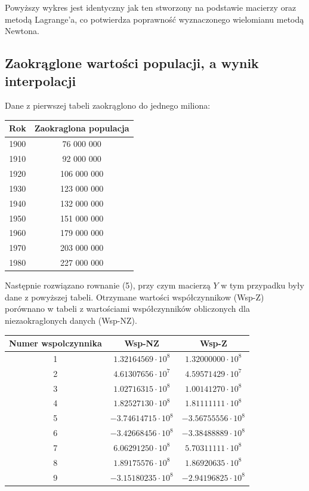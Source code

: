 \documentclass{article}
\begin{document}
	Powyższy wykres jest identyczny jak ten stworzony na podstawie macierzy oraz metodą Lagrange'a, co potwierdza poprawność wyznaczonego wielomianu metodą Newtona.
	
	
	
	\subsection*{Zaokrąglone wartości populacji, a wynik interpolacji}
	
	Dane z pierwszej tabeli zaokrąglono do jednego miliona:
	
	\begin{center}
		\begin{tabular}{c|c}
  			\hline 
  			Rok & Zaokraglona populacja\\
  			\hline
  			1900 & 76 000 000 \\
  			1910 & 92 000 000 \\
  			1920 & 106 000 000 \\
  			1930 & 123 000 000 \\
  			1940 & 132 000 000 \\
  			1950 & 151 000 000 \\
  			1960 & 179 000 000 \\
  			1970 & 203 000 000 \\
  			1980 & 227 000 000 \\
		\end{tabular} 
		
	\end{center}
	
	Następnie rozwiązano rownanie (5), przy czym macierzą $Y$ w tym przypadku były dane z powyższej tabeli. Otrzymane wartości współczynnikow (Wsp-Z) porównano w tabeli z wartościami współczynników obliczonych dla niezaokraglonych danych (Wsp-NZ).
	
	
	\begin{center}
		\begin{tabular}{|c|c|c|}
  			\hline 
  			Numer wspolczynnika & Wsp-NZ & Wsp-Z\\
  			\hline
  			1 & $1.32164569 \cdot 10^8$ & $1.32000000 \cdot 10^8$ \\
  			2 & $4.61307656 \cdot 10^7$ & $4.59571429 \cdot 10^7$ \\
  			3 & $1.02716315 \cdot 10^8$ & $1.00141270 \cdot 10^8$ \\
  			4 & $1.82527130 \cdot 10^8$ & $1.81111111 \cdot 10^8$ \\
  			5 & $-3.74614715 \cdot 10^8$ & $-3.56755556 \cdot 10^8$ \\
  			6 & $-3.42668456 \cdot 10^8$ & $-3.38488889 \cdot 10^8$ \\
  			7 & $6.06291250 \cdot 10^8$ & $5.70311111 \cdot 10^8$ \\
  			8 & $1.89175576 \cdot 10^8$ & $1.86920635 \cdot 10^8$ \\
  			9 & $-3.15180235 \cdot 10^8$ & $-2.94196825 \cdot 10^8$ \\
  			\hline
		\end{tabular} 
		
	\end{center}
	
\end{document}
